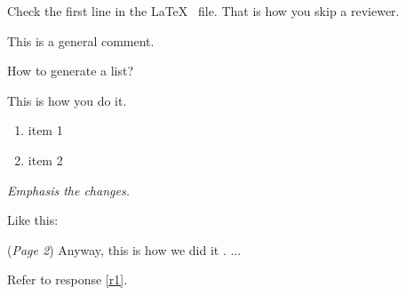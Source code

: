 \setcounter{reviewer@counter}{3}
\reviewer

Check the first line in the \LaTeX~ file. That is how you skip a reviewer.

\begin{generalcomment}
	This is a general comment.
\end{generalcomment}

\begin{revcomment}\label{c1}
	How to generate a list?
\end{revcomment}

\begin{revresponse}\label{r1}
	This is how you do it.
	\begin{enumerate}
		\item item 1
		\item item 2
	\end{enumerate}

\end{revresponse}

\begin{revcomment}\label{c2}
	\emph{Emphasis the changes.}
\end{revcomment}

\begin{revresponse}
	Like this:

	\begin{changes}
		(\emph{Page 2}) Anyway, this is how we did it \cite{2013Management}. ... 
	\end{changes}

	Refer to response \ref{r1}.


\end{revresponse}

